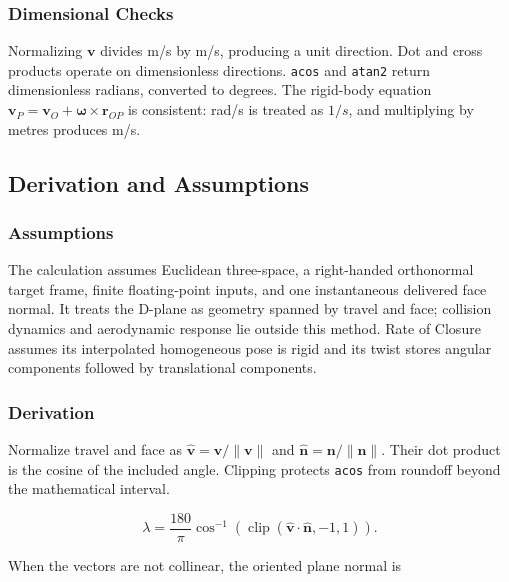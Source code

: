 \documentclass[
  american,
]{article}
\begin{document}
\subsubsection{Dimensional Checks}\label{dimensional-checks}

Normalizing \(\mathbf v\) divides m/s by m/s, producing a unit
direction. Dot and cross products operate on dimensionless directions.
\texttt{acos} and \texttt{atan2} return dimensionless radians, converted
to degrees. The rigid-body equation
\(\mathbf v_P=\mathbf v_O+\boldsymbol\omega\times\mathbf r_{OP}\) is
consistent: rad/s is treated as \(1/s\), and multiplying by metres
produces m/s.

\subsection{Derivation and
Assumptions}\label{derivation-and-assumptions}

\subsubsection{Assumptions}\label{assumptions}

The calculation assumes Euclidean three-space, a right-handed
orthonormal target frame, finite floating-point inputs, and one
instantaneous delivered face normal. It treats the D-plane as geometry
spanned by travel and face; collision dynamics and aerodynamic response
lie outside this method. Rate of Closure assumes its interpolated
homogeneous pose is rigid and its twist stores angular components
followed by translational components.

\subsubsection{Derivation}\label{derivation}

Normalize travel and face as
\(\hat{\mathbf v}=\mathbf v/\lVert\mathbf v\rVert\) and
\(\hat{\mathbf n}=\mathbf n/\lVert\mathbf n\rVert\). Their dot product
is the cosine of the included angle. Clipping protects \texttt{acos}
from roundoff beyond the mathematical interval.

\protect{}\label{dplane-spin-loft-equation}{}

\[
\lambda = \frac{180}{\pi}
  \cos^{-1}\!\left(
    \operatorname{clip}(\hat{\mathbf v}\cdot\hat{\mathbf n},-1,1)
  \right).
\]

When the vectors are not collinear, the oriented plane normal is
\end{document}
